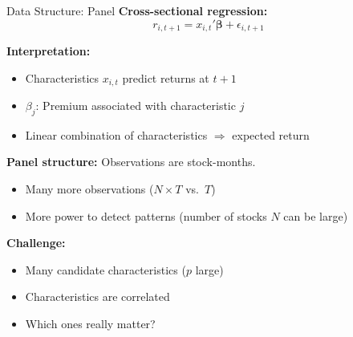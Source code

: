 \documentclass[10pt]{beamer}
\begin{document}

\begin{frame}{Data Structure: Panel}
\textbf{Cross-sectional regression:}
\[
r_{i,t+1} = x_{i,t}'\boldsymbol{\beta} + \epsilon_{i,t+1}
\]

\vspace{0.5em}
\textbf{Interpretation:}
\begin{itemize}
  \item Characteristics $x_{i,t}$ predict returns at $t+1$
  \item $\beta_j$: Premium associated with characteristic $j$
  \item Linear combination of characteristics $\Rightarrow$ expected return
\end{itemize}

\vspace{0.5em}
\textbf{Panel structure:} Observations are stock-months.
\begin{itemize}
  \item Many more observations ($N \times T$ vs.\ $T$)
  \item More power to detect patterns (number of stocks $N$ can be large)
\end{itemize}

\vspace{1em}
\textbf{Challenge:}
\begin{itemize}
  \item Many candidate characteristics ($p$ large)
  \item Characteristics are correlated
  \item Which ones really matter?
\end{itemize}

\end{frame}

\end{document}
